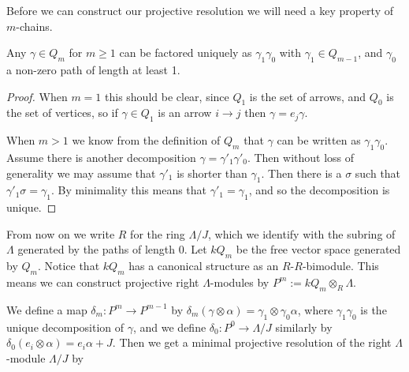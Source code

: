 Before we can construct our projective resolution we will need a key property of $m$-chains. 

\begin{lemma}\label{lem:unique_factorization_of_chains}
	Any $\gamma\in Q_m$ for $m \geq 1$ can be factored uniquely as $\gamma_1\gamma_0$ with $\gamma_1 \in Q_{m-1}$, and $\gamma_0$ a non-zero path of length at least 1.
	\begin{proof}
		When $m=1$ this should be clear, since $Q_1$ is the set of arrows, and $Q_0$ is the set of vertices, so if $\gamma \in Q_1$ is an arrow $i\to j$ then $\gamma = e_j\gamma$.
		
		When $m > 1$ we know from the definition of $Q_m$ that $\gamma$ can be written as $\gamma_1\gamma_0$. Assume there is another decomposition $\gamma = \gamma'_1\gamma'_0$. Then without loss of generality we may assume that $\gamma'_1$ is shorter than $\gamma_1$. Then there is a $\sigma$ such that $\gamma'_1\sigma = \gamma_1$. By minimality this means that $\gamma'_1=\gamma_1$, and so the decomposition is unique.
	\end{proof} 
\end{lemma} 

From now on we write $R$ for the ring $\Lambda/J$, which we identify with the subring of $\Lambda$ generated by the paths of length 0. Let $kQ_m$ be the free vector space generated by $Q_m$. Notice that $kQ_m$ has a canonical structure as an $R$-$R$-bimodule. This means we can construct projective right $\Lambda$-modules by $P^m := kQ_m\otimes_R\Lambda$.

\begin{prop}\label{prop:projective_res_of_top_monomial_alg}
We define a map $\delta_m \colon P^m \to P^{m-1}$ by $\delta_m(\gamma \otimes \alpha) = \gamma_1 \otimes \gamma_0\alpha$, where $\gamma_1\gamma_0$ is the unique decomposition of $\gamma$, and we define $\delta_0 \colon P^0 \to \Lambda /J$ similarly by $\delta_0(e_i\otimes \alpha) = e_i\alpha + J$. Then we get a minimal projective resolution of the right $\Lambda$-module $\Lambda/J$ by

\begin{center}
\end{center}
\end{prop}

